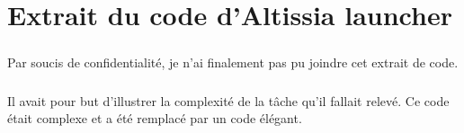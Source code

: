 \chapter{Extrait du code d'Altissia launcher}
\label{ch:altissia-launcher-code}

\paragraph{}
Par soucis de confidentialité, je n'ai finalement pas pu joindre cet extrait de code.

\paragraph{}
Il avait pour but d'illustrer la complexité de la tâche qu'il fallait relevé.
Ce code était complexe et a été remplacé par un code élégant.
